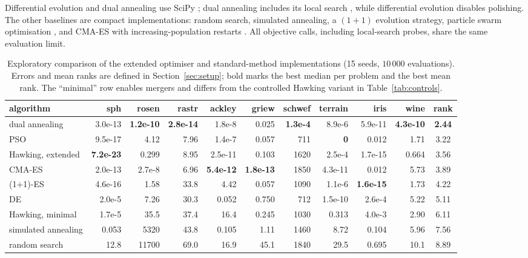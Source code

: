 \documentclass[10pt,a4paper]{article}
\begin{document}
Differential evolution and dual annealing use SciPy
\citep{storn1997,xiang1997,virtanen2020}; dual annealing includes its local
search \citep{scipydualannealingdocs}, while differential evolution disables
polishing. The other baselines
are compact implementations: random search, simulated annealing, a $(1+1)$
evolution strategy, particle swarm optimisation \citep{kennedy1995}, and CMA-ES
with increasing-population restarts \citep{hansen2001,auger2005}. All objective
calls, including local-search probes, share the same evaluation limit.

\begin{table}[htbp]
\centering
\small
\setlength{\tabcolsep}{2.8pt}
\caption{Exploratory comparison of the extended optimiser and standard-method
implementations (15 seeds, $10\,000$ evaluations). Errors and mean ranks are
defined in Section~\ref{sec:setup}; bold marks the best median per problem and
the best mean rank. The ``minimal'' row enables mergers and differs from the controlled
Hawking variant in Table~\ref{tab:controls}.}
\label{tab:full}
\begin{tabular}{@{}lrrrrrrrrrc@{}}
\toprule
algorithm & sph & rosen & rastr & ackley & griew & schwef & terrain & iris & wine & rank \\
\midrule
dual annealing      & 3.0e-13 & \textbf{1.2e-10} & \textbf{2.8e-14} & 1.8e-8 & 0.025 & \textbf{1.3e-4} & 8.9e-6 & 5.9e-11 & \textbf{4.3e-10} & \textbf{2.44} \\
PSO                 & 9.5e-17 & 4.12 & 7.96 & 1.4e-7 & 0.057 & 711 & \textbf{0} & 0.012 & 1.71 & 3.22 \\
Hawking, extended       & \textbf{7.2e-23} & 0.299 & 8.95 & 2.5e-11 & 0.103 & 1620 & 2.5e-4 & 1.7e-15 & 0.664 & 3.56 \\
CMA-ES              & 2.0e-13 & 2.7e-8 & 6.96 & \textbf{5.4e-12} & \textbf{1.8e-13} & 1850 & 4.3e-11 & 0.012 & 5.73 & 3.89 \\
(1+1)-ES            & 4.6e-16 & 1.58 & 33.8 & 4.42 & 0.057 & 1090 & 1.1e-6 & \textbf{1.6e-15} & 1.73 & 4.22 \\
DE                  & 2.0e-5 & 7.26 & 30.3 & 0.052 & 0.750 & 712 & 1.5e-10 & 2.6e-4 & 5.22 & 5.11 \\
Hawking, minimal       & 1.7e-5 & 35.5 & 37.4 & 16.4 & 0.245 & 1030 & 0.313 & 4.0e-3 & 2.90 & 6.11 \\
simulated annealing & 0.053 & 5320 & 43.8 & 0.105 & 1.11 & 1460 & 8.72 & 0.104 & 5.96 & 7.56 \\
random search       & 12.8 & 11700 & 69.0 & 16.9 & 45.1 & 1840 & 29.5 & 0.695 & 10.1 & 8.89 \\
\bottomrule
\end{tabular}
\end{table}
\end{document}
